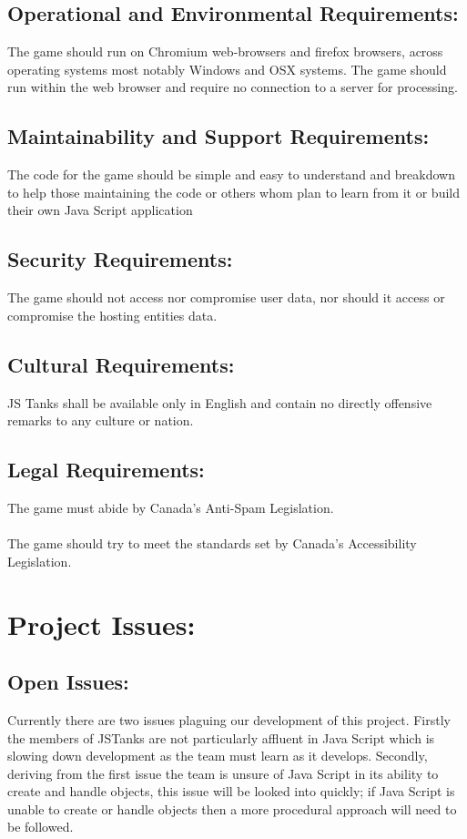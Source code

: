 \documentclass{article}
\begin{document}
\subsection{Operational and Environmental Requirements:}
The game should run on Chromium web-browsers and firefox browsers, across 
operating systems most notably Windows and OSX systems. The game should run 
within the web browser and require no connection to a server for processing.
\subsection{Maintainability and Support Requirements:}
The code for the game should be simple and easy to understand and breakdown 
to help those maintaining the code or others whom plan to learn from it or 
build their own Java Script application
\subsection{Security Requirements:}
The game should not access nor compromise user data, nor should it access or 
compromise the hosting entities data.
\subsection{Cultural Requirements:}
JS Tanks shall be available only in English and contain no directly offensive 
remarks to any culture or nation.
\subsection{Legal Requirements:}
The game must abide by Canada's Anti-Spam Legislation.
\\\\The game should try to meet the standards set by Canada's Accessibility 
Legislation.

\section{Project Issues:}
\subsection{Open Issues:}
Currently there are two issues plaguing our development of this project. Firstly
the members of JSTanks are not particularly affluent in Java Script which is
slowing down development as the team must learn as it develops. Secondly,
deriving from the first issue the team is unsure of Java Script in its ability
to create and handle objects, this issue will be looked into quickly; if Java
Script is unable to create or handle objects then a more procedural approach
will need to be followed.
\end{document}
